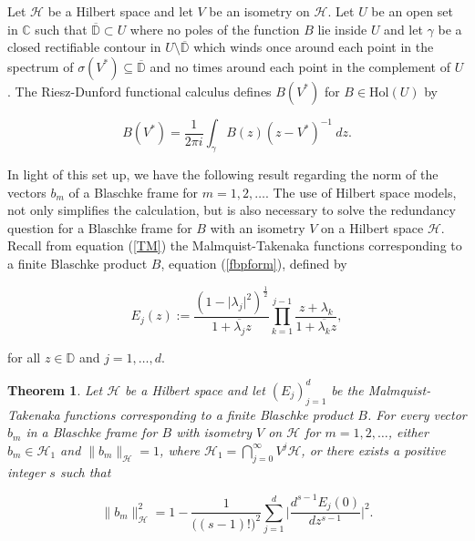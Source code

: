 \documentclass[10pt, reqno]{amsart}
\newtheorem{theorem}{Theorem}[section]
\theoremstyle{definition}
\numberwithin{equation}{section}
\begin{document}
Let $\mathcal{H}$ be a Hilbert space and let $V$ be an isometry on $\mathcal{H}$. Let $U$ be an open set in $\mathbb{C}$ such that $\overline{\mathbb{D}}\subset U$ where no poles of the function $B$ lie inside $U$ and let $\gamma$ be a closed rectifiable contour in $U \setminus \overline{\mathbb{D}}$ which winds once around each point in the spectrum of $\sigma(V^{*})\subseteq\overline{\mathbb{D}}$ and no times around each point in the complement of $U$. The Riesz-Dunford functional calculus defines $B(V^{*})$ for $B\in\mathrm{Hol}(U)$ by

\begin{equation}\label{rieszdunufordblaschkeshift}
    B(V^{*})=\dfrac{1}{2\pi i}\int_{\gamma}B(z)(z-V^{*})^{-1}~dz.
\end{equation}

In light of this set up, we have the following result regarding the norm of the vectors $b_{m}$ of a Blaschke frame for $m=1,2,\hdots$. The use of Hilbert space models, not only simplifies the calculation, but is also necessary to solve the redundancy question for a Blaschke frame for $B$ with an isometry $V$ on a Hilbert space $\mathcal{H}$. Recall from equation (\ref{TM}) the Malmquist-Takenaka functions corresponding to a finite Blaschke product $B$, equation (\ref{fbpform}), defined by


$$E_{j}(z):=\dfrac{(1-\lvert\lambda_{j}\rvert^{2})^{\frac{1}{2}}}{1+\overline{\lambda_{j}}z}\prod_{k=1}^{j-1}\dfrac{z+\lambda_{k}}{1+\overline{\lambda_{k}}z},$$

\noindent for all $z\in\mathbb{D}$ and $j=1,\hdots,d$.

\begin{theorem}\label{normofblaschkevectors}
Let $\mathcal{H}$ be a Hilbert space and let $(E_{j})_{j=1}^{d}$ be the Malmquist-Takenaka functions corresponding to a finite Blaschke product $B$. For every vector $b_{m}$ in a Blaschke frame for $B$ with isometry $V$ on $\mathcal{H}$ for $m=1,2,\hdots$, either $b_{m}\in\mathcal{H}_{1}$ and $\|b_{m}\|_{\mathcal{H}}=1$, where $\mathcal{H}_{1}=\bigcap_{j=0}^{\infty}V^{j}\mathcal{H}$, or there exists a positive integer $s$ such that

$$\|b_{m}\|^{2}_{\mathcal{H}}=1 - \dfrac{1}{\big((s-1)!\big)^{2}}\sum_{j=1}^{d}\Bigg\lvert\dfrac{d^{s-1}E_{j}(0)}{dz^{s-1}}\Bigg\rvert^{2}.$$

\end{theorem}
\end{document}
